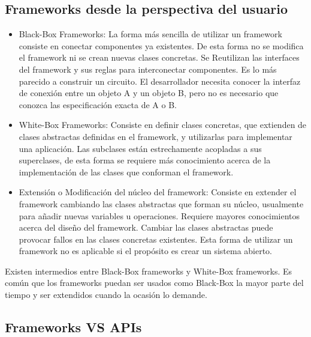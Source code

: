 \subsection{Frameworks desde la perspectiva del usuario}
\label{sec:tipos_framework}
\begin{itemize}

    \item Black-Box Frameworks: La forma más sencilla de utilizar un framework
    consiste en conectar componentes ya existentes. De esta forma no se modifica
    el framework ni se crean nuevas clases concretas.
	Se Reutilizan las interfaces del framework y sus reglas para interconectar
	componentes. Es lo más parecido a construir un circuito. El desarrollador
	necesita conocer la interfaz de conexión entre un objeto A y un objeto B, pero
	no es necesario que conozca las especificación exacta de A o B.

    \item White-Box Frameworks: Consiste en definir clases concretas, que
    extienden de clases abstractas definidas en el framework, y utilizarlas para
    implementar una aplicación. Las subclases están estrechamente acopladas a
    sus superclases, de esta forma se requiere más conocimiento acerca de la
    implementación de las clases que conforman el framework.
	
	\item Extensión o Modificación del núcleo del framework: Consiste en extender
	el framework cambiando las clases abstractas que forman su núcleo, usualmente
	para añadir nuevas variables u operaciones. Requiere mayores
    conocimientos acerca del diseño del framework. Cambiar las clases abstractas
	puede provocar fallos en las clases concretas existentes. Esta forma de
	utilizar un framework no es aplicable si el propósito es crear un
	sistema abierto.
\end{itemize}

Existen intermedios entre Black-Box frameworks y White-Box frameworks. Es común
que los frameworks puedan ser usados como Black-Box la mayor parte del tiempo y
ser extendidos cuando la ocasión lo demande.

\subsection{Frameworks VS APIs}

